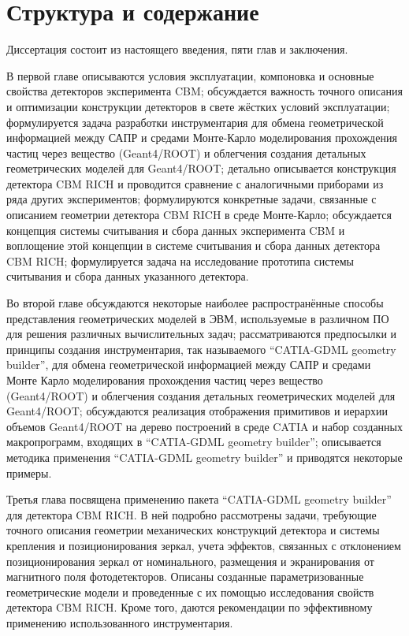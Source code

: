 \section*{Структура и содержание}\label{sec:secStructureAndContent}

Диссертация состоит из настоящего введения, пяти глав и заключения.

В первой главе
описываются условия эксплуатации, компоновка и основные свойства детекторов эксперимента CBM;
обсуждается важность точного описания и оптимизации конструкции детекторов в свете жёстких условий эксплуатации;
формулируется задача разработки инструментария для обмена геометрической информацией между САПР и средами Монте-Карло моделирования прохождения частиц через вещество (Geant4/ROOT) и облегчения создания детальных геометрических моделей для Geant4/ROOT;
детально описывается конструкция детектора CBM RICH и проводится сравнение с аналогичными приборами из ряда других экспериментов;
формулируются конкретные задачи, связанные с описанием геометрии детектора CBM RICH в среде Монте-Карло;
обсуждается концепция системы считывания и сбора данных эксперимента CBM и воплощение этой концепции в системе считывания и сбора данных детектора CBM RICH;
формулируется задача на исследование прототипа системы считывания и сбора данных указанного детектора.

Во второй главе
обсуждаются некоторые наиболее распространённые способы представления геометрических моделей в ЭВМ, используемые в различном ПО для решения различных вычислительных задач;
рассматриваются предпосылки и принципы создания инструментария, так называемого ``CATIA-GDML geometry builder'', для обмена геометрической информацией между САПР и средами Монте Карло моделирования прохождения частиц через вещество (Geant4/ROOT) и облегчения создания детальных геометрических моделей для Geant4/ROOT;
обсуждаются реализация отображения примитивов и иерархии объемов Geant4/ROOT на дерево построений в среде CATIA и набор созданных макропрограмм, входящих в ``CATIA-GDML geometry builder'';
описывается методика применения ``CATIA-GDML geometry builder'' и приводятся некоторые примеры.

Третья глава
посвящена применению пакета ``CATIA-GDML geometry builder'' для детектора CBM RICH. В ней подробно рассмотрены задачи, требующие точного описания геометрии механических конструкций детектора и системы крепления и позиционирования зеркал, учета эффектов, связанных с отклонением позиционирования зеркал от номинального, размещения и экранирования от магнитного поля фотодетекторов. Описаны созданные параметризованные геометрические модели и проведенные с их помощью исследования свойств детектора CBM RICH. Кроме того, даются рекомендации по эффективному применению использованного инструментария.

